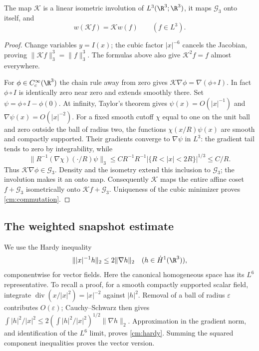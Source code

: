 \begin{lemma}
\label{cm:covariance}
The map $\mathcal K$ is a linear isometric involution of $L^3(\R^3;\R^3)$,
it maps $\mathcal G_3$ onto itself, and
\begin{equation}\label{cm:commutation}
 w(\mathcal Kf)=\mathcal K w(f)\qquad(f\in L^3).
\end{equation}
\end{lemma}
\begin{proof}
Change variables $y=I(x)$; the cubic factor $|x|^{-6}$ cancels the
Jacobian, proving $\|\mathcal Kf\|_3^3=\|f\|_3^3$. The formulas above
also give $\mathcal K^2 f=f$ almost everywhere.

For $\phi\in C_c^\infty(\R^3)$ the chain rule away from zero gives
$\mathcal K\nabla\phi=\nabla(\phi\circ I)$. In fact $\phi\circ I$ is
identically zero near zero and extends smoothly there. Set
$\psi=\phi\circ I-\phi(0)$. At infinity, Taylor's theorem gives
$\psi(x)=O(|x|^{-1})$ and $\nabla\psi(x)=O(|x|^{-2})$. For a fixed smooth
cutoff $\chi$ equal to one on the unit ball and zero outside the ball of
radius two, the functions $\chi(x/R)\psi(x)$ are smooth and compactly
supported. Their gradients converge to $\nabla\psi$ in $L^3$:
the gradient tail tends to zero by integrability, while
\[
 \|R^{-1}(\nabla\chi)(\cdot/R)\psi\|_3
 \le C R^{-1}R^{-1}|\{R<|x|<2R\}|^{1/3}\le C/R.
\]
Thus $\mathcal K\nabla\phi\in\mathcal G_3$. Density and the isometry
extend this inclusion to $\mathcal G_3$; the involution makes it an
onto map. Consequently $\mathcal K$ maps the entire affine coset
$f+\mathcal G_3$ isometrically onto $\mathcal Kf+\mathcal G_3$.
Uniqueness of the cubic minimizer proves \eqref{cm:commutation}.
\end{proof}

\subsection{The weighted snapshot estimate}

We use the Hardy inequality
\begin{equation}\label{cm:hardy}
 \||x|^{-1}h\|_2\le2\|\nabla h\|_2
 \quad(h\in\dot H^1(\R^3)),
\end{equation}
componentwise for vector fields. Here the canonical homogeneous space has
its $L^6$ representative. To recall a proof, for a smooth compactly
supported scalar field, integrate $\operatorname{div}(x/|x|^2)=|x|^{-2}$
against $|h|^2$. Removal of a ball of radius $\varepsilon$ contributes
$O(\varepsilon)$; Cauchy--Schwarz then gives
$\int|h|^2/|x|^2\le2(\int|h|^2/|x|^2)^{1/2}\|\nabla h\|_2$.
Approximation in the gradient norm, and identification of the $L^6$
limit, proves \eqref{cm:hardy}. Summing the squared component inequalities
proves the vector version.

